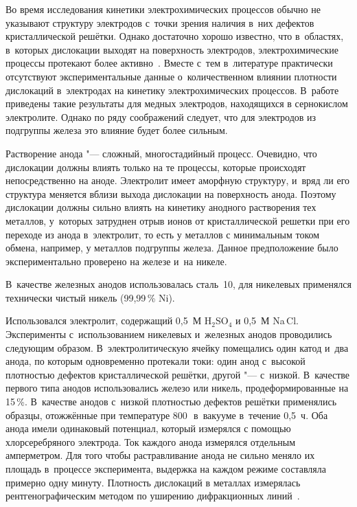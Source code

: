 \date{13/VI/2012}

\maketitle

\small


Во время исследования кинетики электрохимических процессов обычно не указывают структуру
электродов с~точки зрения наличия в~них дефектов кристаллической решётки. 
Однако достаточно хорошо известно, что в~областях,  в~которых дислокации выходят на поверхность электродов,
электрохимические процессы протекают более активно~\cite{vasy:bib1}. 
Вместе с~тем в~литературе практически отсутствуют экспериментальные данные о~количественном влиянии плотности дислокаций в~электродах на кинетику электрохимических процессов. 
В~работе \cite{vasy:bib2} приведены такие результаты для медных электродов, находящихся в сернокислом электролите.
Однако по ряду соображений следует, что для электродов из подгруппы железа это влияние будет более сильным.

Растворение анода "--- сложный, многостадийный процесс. Очевидно, что дислокации должны влиять только на те процессы, которые происходят непосредственно на аноде. 
Электролит имеет аморфную  структуру, и~вряд ли его структура меняется вблизи выхода дислокации на поверхность анода. Поэтому дислокации должны сильно влиять на кинетику анодного растворения тех металлов, у~которых затруднен отрыв ионов от кристаллической решетки при его переходе из анода в~электролит, то есть у металлов с минимальным током
обмена, например, у металлов подгруппы железа. 
Данное предположение было экспериментально проверено на железе и~на никеле.

\smallskip

 В~качестве железных анодов
использовалась сталь~10, для никелевых применялся технически чистый никель (99,99\,\% Ni).

Использовался электролит, содержащий 0,5~М H$_2$SO$_4$ и 0,5~М Na\!\,Cl. 
Эксперименты с~использованием никелевых и~железных анодов проводились следующим образом. 
В~электролитическую ячейку помещались один катод и~два анода, по которым одновременно протекали токи:
один анод с~высокой плотностью дефектов кристаллической решётки, другой "--- с~низкой. 
В~качестве первого типа анодов использовались железо или никель, продеформированные на 15\,\%. 
В~качестве анодов с~низкой плотностью дефектов решётки применялись образцы, отожжённые при температуре 800\,\textcelsius\  в~вакууме в~течение 0,5~ч.
Оба анода имели одинаковый потенциал, который измерялся с помощью хлорсеребряного электрода. 
Ток каждого анода измерялся отдельным амперметром. 
Для того чтобы растравливание анода не сильно меняло их площадь в~процессе эксперимента, выдержка на каждом режиме составляла примерно одну минуту.
Плотность дислокаций в металлах измерялась рентгенографическим методом по уширению дифракционных линий~\cite{vasy:bib3}.

